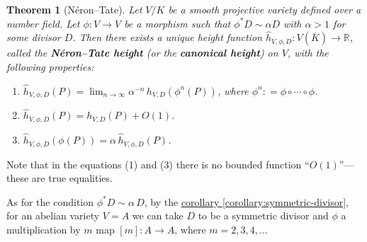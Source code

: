 \documentclass{article}
\newcommand{\refref}[2]{\hyperref[#2]{#1 \ref*{#2}}}
\newtheorem{theorem}[proposition]{Theorem}
\theoremstyle{definition}
\newcommand{\term}{\textbf}
\newcommand{\dfn}{\mathrel{\mathop:}=}
\newcommand{\RR}{\mathbb{R}}
\begin{document}
\begin{theorem}[N\'eron--Tate]
  Let $V/K$ be a smooth projective variety defined over a number field.
  Let $\phi\colon V\to V$ be a morphism such that $\phi^* D \sim \alpha D$ with
  $\alpha > 1$ for some divisor $D$. Then there exists a unique height function
  $\widehat{h}_{V,\phi,D}\colon V (\overline{K}) \to \RR$, called the
  \term{N\'eron--Tate height} (or the \term{canonical height}) on $V$, with the
  following properties:
  \begin{enumerate}
  \item[(1)] $\widehat{h}_{V,\phi,D} (P) = \lim_{n\to \infty} \alpha^{-n} \, h_{V,D} (\phi^n (P))$,
    where $\phi^n \dfn \phi\circ\cdots\circ\phi$.

  \item[(2)] $\widehat{h}_{V,\phi,D} (P) = h_{V,D} (P) + O (1)$.

  \item[(3)] $\widehat{h}_{V,\phi,D} (\phi (P)) = \alpha \, \widehat{h}_{V,\phi,D} (P)$.
  \end{enumerate}
\end{theorem}

Note that in the equations (1) and (3) there is no bounded function
``$O (1)$''---these are true equalities.

As for the condition $\phi^* D \sim \alpha\,D$, by the
\refref{corollary}{corollary:symmetric-divisor}, for an abelian variety $V=A$
we can take $D$ to be a symmetric divisor and $\phi$ a multiplication by $m$ map
$[m]\colon A\to A$, where $m = 2,3,4,\ldots$
\end{document}
